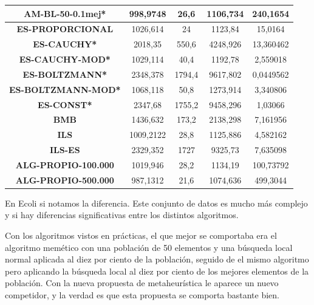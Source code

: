 \documentclass[12pt, spanish]{article}
\begin{document}
\begin{table}[H]
\begin{tabular}{|c|c|c|c|c|}
\textbf{AM-BL-50-0.1mej*}   & 998,9748                  & 26,6                        & 1106,734               & 240,1654   \\ \hline
\textbf{ES-PROPORCIONAL}    & 1026,614                  & 24                          & 1123,84                & 15,0164    \\ \hline
\textbf{ES-CAUCHY*}         & 2018,35                   & 550,6                       & 4248,926               & 13,360462  \\ \hline
\textbf{ES-CAUCHY-MOD*}     & 1029,114                  & 40,4                        & 1192,78                & 2,559018   \\ \hline
\textbf{ES-BOLTZMANN*}      & 2348,378                  & 1794,4                      & 9617,802               & 0,0449562  \\ \hline
\textbf{ES-BOLTZMANN-MOD*}  & 1068,118                  & 50,8                        & 1273,914               & 3,340806   \\ \hline
\textbf{ES-CONST*}          & 2347,68                   & 1755,2                      & 9458,296               & 1,03066    \\ \hline
\textbf{BMB}                & 1436,632                  & 173,2                       & 2138,298               & 7,161956   \\ \hline
\textbf{ILS}                & 1009,2122                 & 28,8                        & 1125,886               & 4,582162   \\ \hline
\textbf{ILS-ES}             & 2329,352                  & 1727                        & 9325,73                & 7,635098   \\ \hline
\textbf{ALG-PROPIO-100.000} & 1019,946                  & 28,2                        & 1134,19                & 100,73792  \\ \hline
\textbf{ALG-PROPIO-500.000} & 987,1312                  & 21,6                        & 1074,636               & 499,3044   \\ \hline
\end{tabular}
\end{table}

En Ecoli si notamos la diferencia. Este conjunto de datos es mucho más complejo y si hay diferencias significativas entre los distintos algoritmos.

Con los algoritmos vistos en prácticas, el que mejor se comportaba era el algoritmo memético con una población de 50 elementos y una búsqueda local normal aplicada al diez por ciento de la población, seguido de el mismo algoritmo pero aplicando la búsqueda local al diez por ciento de los mejores elementos de la población. Con la nueva propuesta de metaheurística le aparece un nuevo competidor, y la verdad es que esta propuesta se comporta bastante bien. 
\end{document}
